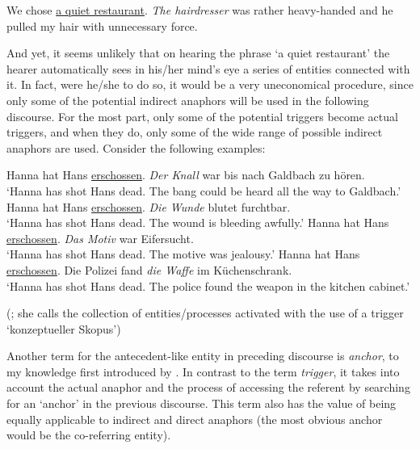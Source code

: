 \documentclass[output=paper]{langsci/langscibook}
\begin{document}
\begin{exe}
\ex\label{6ex:10}
We chose {\ul{a quiet restaurant}}. {\emph{The hairdresser}} was rather heavy-handed and he pulled my hair with unnecessary force.
\end{exe}

And yet, it seems unlikely that on hearing the phrase `a quiet restaurant' the hearer automatically sees in his/her mind's eye a series of entities connected with it. In fact, were he/she to do so, it would be a very uneconomical procedure, since only some of the potential indirect anaphors will be used in the following discourse. For the most part, only some of the potential triggers become actual triggers, and when they do, only some of the wide range of possible indirect anaphors are used. Consider the following examples:

\begin{exe}
\ex\label{6ex:11}
	\begin{xlista}
	\ex\label{6ex:11a}
	Hanna hat Hans {\ul{erschossen}}. {\emph{Der Knall}} war bis nach Galdbach zu hören. \\
	`Hanna has shot Hans dead. The bang could be heard all the way to Galdbach.'
	\ex\label{6ex:11b}
	Hanna hat Hans {\ul{erschossen}}. {\emph{Die Wunde}} blutet furchtbar. \\
	`Hanna has shot Hans dead. The wound is bleeding awfully.'
	\ex\label{6ex:11c}
	Hanna hat Hans {\ul{erschossen}}. {\emph{Das Motiv}} war Eifersucht. \\
	`Hanna has shot Hans dead. The motive was jealousy.'
	\ex\label{6ex:11c}
	Hanna hat Hans {\ul{erschossen}}. Die Polizei fand {\emph{die Waffe}} im Küchenschrank. \\
	`Hanna has shot Hans dead. The police found the weapon in the kitchen cabinet.'
	\end{xlista}
\exi{} (\citealt[][38]{schwarz:00}; she calls the collection of entities/processes activated with the use of a trigger `konzeptueller Skopus')
\end{exe}

Another term for the antecedent-like entity in preceding discourse is {\emph{anchor}}, to my knowledge first introduced by \cite{fraurud:90}. In contrast to the term {\emph{trigger}}, it takes into account the actual anaphor and the process of accessing the referent by searching for an `anchor' in the previous discourse. This term also has the value of being equally applicable to indirect and direct anaphors (the most obvious anchor would be the co-referring entity).
\end{document}
